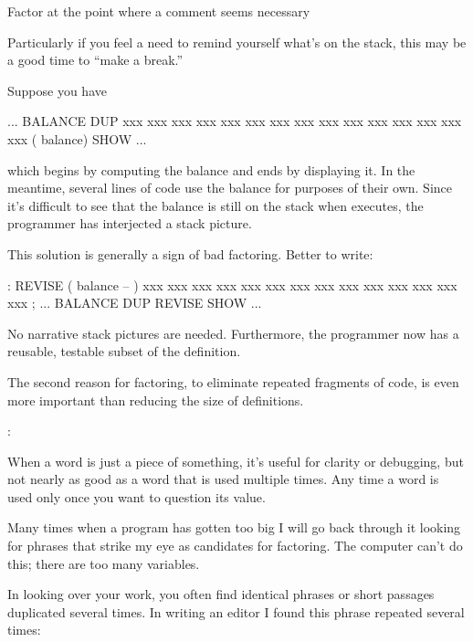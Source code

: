 \begin{tip}
Factor at the point where a comment seems necessary
\end{tip}
Particularly if you feel a need to remind yourself what's on the
stack, this may be a good time to ``make a break.''

\goodbreak
Suppose you have
\begin{Code}
... BALANCE  DUP xxx xxx xxx xxx xxx xxx xxx xxx xxx
     xxx xxx xxx xxx xxx xxx   ( balance) SHOW  ...
\end{Code}
which begins by computing the balance and ends by displaying it. In
the meantime, several lines of code use the balance for purposes of
their own. Since it's difficult to see that the balance is still on
the stack when  executes, the programmer has interjected a
stack picture.

This solution is generally a sign of bad factoring. Better to write:
\begin{Code}
: REVISE  ( balance -- )  xxx xxx xxx xxx xxx xxx xxx
     xxx xxx xxx xxx xxx xxx xxx ;
... BALANCE  DUP REVISE  SHOW  ...
\end{Code}
No narrative stack pictures are needed. Furthermore, the programmer
now has a reusable, testable subset of the definition.

\begin{tip}
The second reason for factoring, to eliminate repeated fragments of
code, is even more important than reducing the size of definitions.
\end{tip}

\begin{interview}
:

\begin{tfquot}
When a word is just a piece of something, it's useful for clarity or
debugging, but not nearly as good as a word that is used multiple
times. Any time a word is used only once you want to question its
value.

Many times when a program has gotten too big I will go back through it
looking for phrases that strike my eye as candidates for factoring.
The computer can't do this; there are too many variables.
\end{tfquot}
\end{interview}
In looking over your work, you often find identical phrases or short
passages duplicated several times. In writing an editor I found this
phrase repeated several times:

